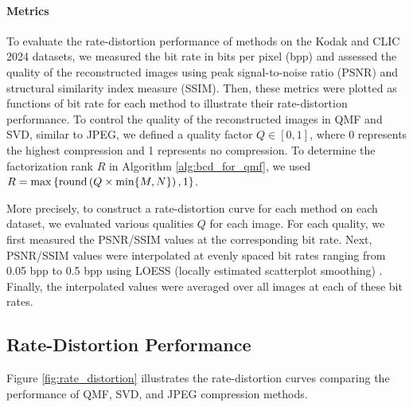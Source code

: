 \paragraph{Metrics}
To evaluate the rate-distortion performance of methods on the Kodak and CLIC 2024 datasets, we measured the bit rate in bits per pixel (bpp) and assessed the quality of the reconstructed images using peak signal-to-noise ratio (PSNR) and structural similarity index measure (SSIM). Then, these metrics were plotted as functions of bit rate for each method to illustrate their rate-distortion performance. To control the quality of the reconstructed images in QMF and SVD, similar to JPEG, we defined a quality factor $Q\in[0,1]$, where 0 represents the highest compression and 1 represents no compression. To determine the factorization rank $R$ in Algorithm \ref{alg:bcd_for_qmf}, we used $R = \max\left\{\operatorname{round}\left(Q \times \min\{M,N\}\right), 1\right\}$.

More precisely, to construct a rate-distortion curve for each method on each dataset, we evaluated various qualities $Q$ for each image. For each quality, we first measured the PSNR/SSIM values at the corresponding bit rate. Next, PSNR/SSIM values were interpolated at evenly spaced bit rates ranging from 0.05 bpp to 0.5 bpp using LOESS (locally estimated scatterplot smoothing) \cite{cleveland1988locally}. Finally, the interpolated values were averaged over all images at each of these bit rates.


\subsection{Rate-Distortion Performance} \label{sec:rate_distortion_performance}

Figure \ref{fig:rate_distortion} illustrates the rate-distortion curves comparing the performance of QMF, SVD, and JPEG compression methods.

